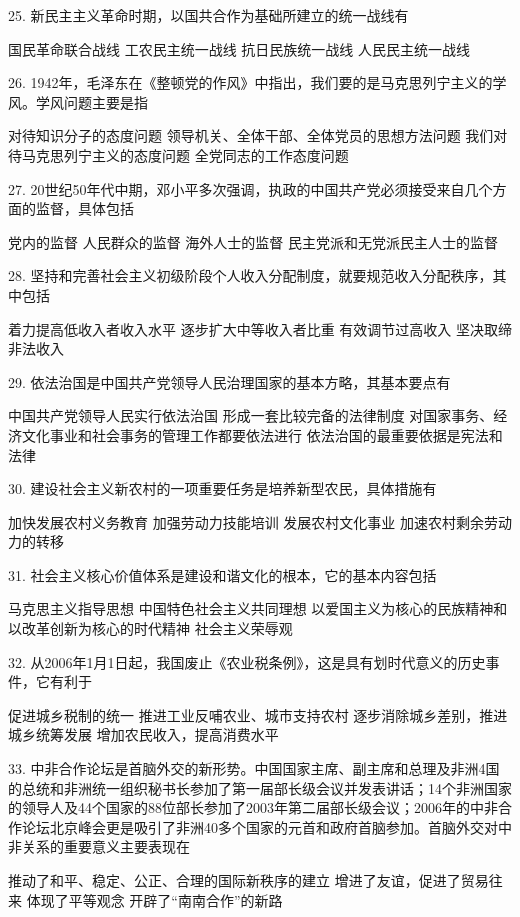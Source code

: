 25. 新民主主义革命时期，以国共合作为基础所建立的统一战线有
\begin{choices}
	 国民革命联合战线
	 工农民主统一战线
	 抗日民族统一战线
	 人民民主统一战线
\end{choices}
26. 1942年，毛泽东在《整顿党的作风》中指出，我们要的是马克思列宁主义的学风。学风问题主要是指
\begin{choices}
	 对待知识分子的态度问题
	 领导机关、全体干部、全体党员的思想方法问题
	 我们对待马克思列宁主义的态度问题
	 全党同志的工作态度问题
\end{choices}
27. 20世纪50年代中期，邓小平多次强调，执政的中国共产党必须接受来自几个方面的监督，具体包括
\begin{choices}
	 党内的监督
	 人民群众的监督
	 海外人士的监督
	 民主党派和无党派民主人士的监督
\end{choices}
28. 坚持和完善社会主义初级阶段个人收入分配制度，就要规范收入分配秩序，其中包括
\begin{choices}
	 着力提高低收入者收入水平
	 逐步扩大中等收入者比重
	 有效调节过高收入
	 坚决取缔非法收入
\end{choices}
29. 依法治国是中国共产党领导人民治理国家的基本方略，其基本要点有
\begin{choices}
	 中国共产党领导人民实行依法治国
	 形成一套比较完备的法律制度
	 对国家事务、经济文化事业和社会事务的管理工作都要依法进行
	 依法治国的最重要依据是宪法和法律
\end{choices}
30. 建设社会主义新农村的一项重要任务是培养新型农民，具体措施有
\begin{choices}
	 加快发展农村义务教育
	 加强劳动力技能培训
	 发展农村文化事业
	 加速农村剩余劳动力的转移
\end{choices}
31. 社会主义核心价值体系是建设和谐文化的根本，它的基本内容包括
\begin{choices}
	 马克思主义指导思想
	 中国特色社会主义共同理想
	 以爱国主义为核心的民族精神和以改革创新为核心的时代精神
	 社会主义荣辱观
\end{choices}
32. 从2006年1月1日起，我国废止《农业税条例》，这是具有划时代意义的历史事件，它有利于
\begin{choices}
	 促进城乡税制的统一
	 推进工业反哺农业、城市支持农村
	 逐步消除城乡差别，推进城乡统筹发展
	 增加农民收入，提高消费水平
\end{choices}
33. 中非合作论坛是首脑外交的新形势。中国国家主席、副主席和总理及非洲4国的总统和非洲统一组织秘书长参加了第一届部长级会议并发表讲话；14个非洲国家的领导人及44个国家的88位部长参加了2003年第二届部长级会议；2006年的中非合作论坛北京峰会更是吸引了非洲40多个国家的元首和政府首脑参加。首脑外交对中非关系的重要意义主要表现在
\begin{choices}
	 推动了和平、稳定、公正、合理的国际新秩序的建立
	 增进了友谊，促进了贸易往来
	 体现了平等观念
	 开辟了“南南合作”的新路
\end{choices}
\vspace{6pt}
